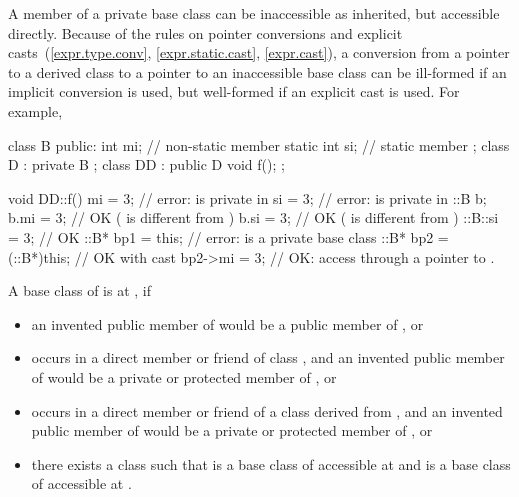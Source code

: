 \pnum
\begin{note}
A member of a private base class can be inaccessible as inherited,
but accessible directly.
Because of the rules on pointer conversions and
explicit casts~(\ref{expr.type.conv}, \ref{expr.static.cast}, \ref{expr.cast}),
a conversion from a pointer to a derived class to a pointer
to an inaccessible base class can be ill-formed if an implicit conversion
is used, but well-formed if an explicit cast is used.
For example,

\begin{codeblock}
class B {
public:
  int mi;                       // non-static member
  static int si;                // static member
};
class D : private B {
};
class DD : public D {
  void f();
};

void DD::f() {
  mi = 3;                       // error:  is private in 
  si = 3;                       // error:  is private in 
  ::B  b;
  b.mi = 3;                     // OK ( is different from )
  b.si = 3;                     // OK ( is different from )
  ::B::si = 3;                  // OK
  ::B* bp1 = this;              // error:  is a private base class
  ::B* bp2 = (::B*)this;        // OK with cast
  bp2->mi = 3;                  // OK: access through a pointer to .
}
\end{codeblock}
\end{note}

\pnum
A base class
of
is
at
,
if
\begin{itemize}
\item
an invented public member of
would be a public member of
, or
\item
{}
occurs in a direct member or friend of class
,
and an invented public member of
would be a private or protected member of
, or
\item
{}
occurs in a direct member or friend of a class
derived from
,
and an invented public member of
would be a private or protected member of
, or
\item
there exists a class
such that
is a base class of
accessible at
and
is a base class of
accessible at
.
\end{itemize}

